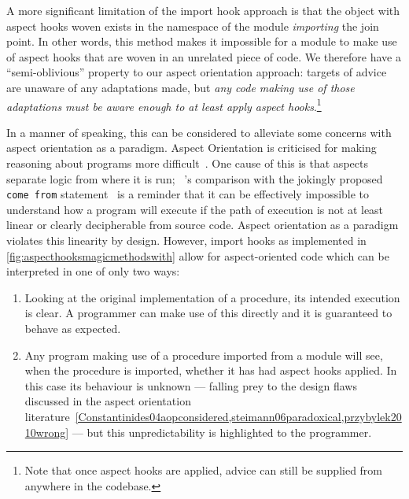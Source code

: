 A more significant limitation of the import hook approach is that the object
with aspect hooks woven exists in the namespace of the module \emph{importing}
the join point. In other words, this method makes it impossible for a module to
make use of aspect hooks that are woven in an unrelated piece of code.
We therefore have a ``semi-oblivious'' property to our aspect orientation approach:
targets of advice are unaware of any adaptations made, but \emph{any code making
use of those adaptations must be aware enough to at least apply aspect
hooks}.\footnote{Note that once aspect hooks are applied, advice can still be
supplied from anywhere in the codebase.}

In a manner of speaking, this can be considered to alleviate some concerns with
aspect orientation as a paradigm. Aspect Orientation is criticised for making
reasoning about programs more
difficult~\cite{przybylek2010wrong,Constantinides04aopconsidered,steimann06paradoxical}.
One cause of this is that aspects separate logic from where it is run;
\citeauthor{Constantinides04aopconsidered}~'s comparison with the jokingly
proposed \lstinline{come from}
statement~\cite{clark73comefrom,Constantinides04aopconsidered} is a reminder
that it can be effectively impossible to understand how a program will execute
if the path of execution is not at least linear or clearly decipherable from
source code. Aspect orientation as a paradigm violates this
linearity by design. However, import hooks as implemented in
\cref{fig:aspecthooksmagicmethodswith} allow for aspect-oriented code which can be interpreted in
one of only two ways:

\begin{enumerate}
    \item Looking at the original implementation of a procedure, its intended
    execution is clear. A programmer can make use of this directly and it is
    guaranteed to behave as expected.
    \item Any program making use of a procedure imported from a module will see,
    when the procedure is imported, whether it has had aspect hooks applied. In
    this case its behaviour is unknown --- falling prey to the design flaws
    discussed in the aspect orientation
    literature~\cref{Constantinides04aopconsidered,steimann06paradoxical,przybylek2010wrong}
    --- but this unpredictability is highlighted to the
    programmer.
\end{enumerate}

